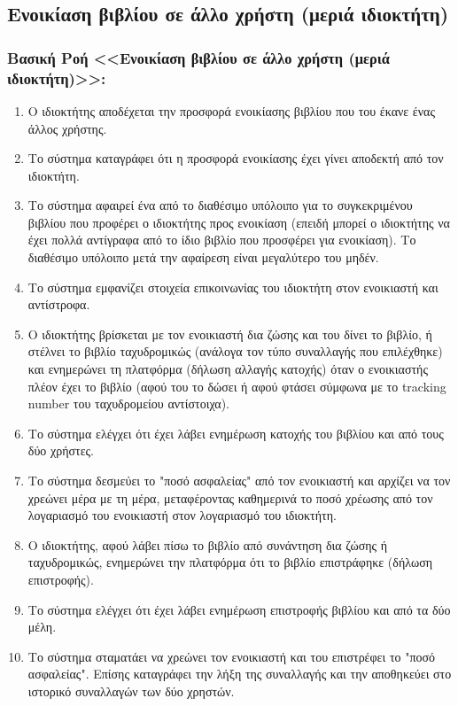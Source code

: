 \documentclass[12pt,a4paper]{article}
\begin{document}
\subsection{Ενοικίαση βιβλίου σε άλλο χρήστη (μεριά ιδιοκτήτη)}
\subsubsection*{Βασική Ροή <<Ενοικίαση βιβλίου σε άλλο χρήστη (μεριά ιδιοκτήτη)>>:}
\begin{enumerate}
    \item Ο ιδιοκτήτης αποδέχεται την προσφορά ενοικίασης βιβλίου που του έκανε ένας άλλος χρήστης.
    \item Το σύστημα καταγράφει ότι η προσφορά ενοικίασης έχει γίνει αποδεκτή από τον ιδιοκτήτη. 
    \item Το σύστημα αφαιρεί ένα από το διαθέσιμο υπόλοιπο για το συγκεκριμένου βιβλίου που προφέρει ο ιδιοκτήτης προς ενοικίαση (επειδή μπορεί ο ιδιοκτήτης να έχει πολλά αντίγραφα από το ίδιο βιβλίο που προσφέρει για ενοικίαση). Το διαθέσιμο υπόλοιπο μετά την αφαίρεση είναι μεγαλύτερο του μηδέν.
    \item Το σύστημα εμφανίζει στοιχεία επικοινωνίας του ιδιοκτήτη στον ενοικιαστή και αντίστροφα.
    \item Ο ιδιοκτήτης βρίσκεται με τον ενοικιαστή δια ζώσης και του δίνει το βιβλίο, ή στέλνει το βιβλίο ταχυδρομικώς (ανάλογα τον τύπο συναλλαγής που επιλέχθηκε) και ενημερώνει τη πλατφόρμα (δήλωση αλλαγής κατοχής) όταν ο ενοικιαστής πλέον έχει το βιβλίο (αφού του το δώσει ή αφού φτάσει σύμφωνα με το tracking number του ταχυδρομείου αντίστοιχα).
    \item Το σύστημα ελέγχει ότι έχει λάβει ενημέρωση κατοχής του βιβλίου και από τους δύο χρήστες. 
    \item Το σύστημα δεσμεύει το "ποσό ασφαλείας" από τον ενοικιαστή και αρχίζει να τον χρεώνει μέρα με τη μέρα, μεταφέροντας καθημερινά το ποσό χρέωσης από τον λογαριασμό του ενοικιαστή στον λογαριασμό του ιδιοκτήτη.
    \item Ο ιδιοκτήτης, αφού λάβει πίσω το βιβλίο από συνάντηση δια ζώσης ή ταχυδρομικώς, ενημερώνει την πλατφόρμα ότι το βιβλίο επιστράφηκε (δήλωση επιστροφής).
    \item Το σύστημα ελέγχει ότι έχει λάβει ενημέρωση επιστροφής βιβλίου και από τα δύο μέλη.
    \item Το σύστημα σταματάει να χρεώνει τον ενοικιαστή και του επιστρέφει το "ποσό ασφαλείας". Επίσης καταγράφει την λήξη της συναλλαγής και την αποθηκεύει στο ιστορικό συναλλαγών των δύο χρηστών.
\end{enumerate}
\end{document}
